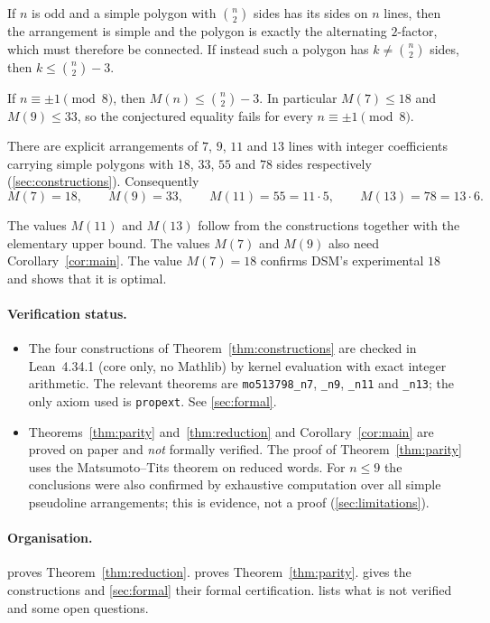 \begin{theorem}[Reduction]\label{thm:reduction}
If $n$ is odd and a simple polygon with $\binom n2$ sides has its sides on $n$ lines, then the
arrangement is simple and the polygon is exactly the alternating $2$-factor, which must therefore be
connected. If instead such a polygon has $k\neq\binom n2$ sides, then $k\le\binom n2-3$.
\end{theorem}

\begin{corollary}\label{cor:main}
If $n\equiv\pm1\pmod 8$, then $M(n)\le\binom n2-3$. In particular $M(7)\le 18$ and $M(9)\le 33$, so
the conjectured equality fails for every $n\equiv\pm 1\pmod 8$.
\end{corollary}

\begin{theorem}\label{thm:constructions}
There are explicit arrangements of $7$, $9$, $11$ and $13$ lines with integer coefficients carrying
simple polygons with $18$, $33$, $55$ and $78$ sides respectively (\cref{sec:constructions}).
Consequently
\[
  M(7)=18,\qquad M(9)=33,\qquad M(11)=55=11\cdot 5,\qquad M(13)=78=13\cdot 6 .
\]
\end{theorem}

The values $M(11)$ and $M(13)$ follow from the constructions together with the elementary upper bound.
The values $M(7)$ and $M(9)$ also need Corollary~\ref{cor:main}. The value $M(7)=18$ confirms DSM's
experimental $18$ and shows that it is optimal.

\paragraph{Verification status.}
\begin{itemize}
\item The four constructions of Theorem~\ref{thm:constructions} are checked in Lean~4.34.1 (core only, no
  Mathlib) by kernel evaluation with exact integer arithmetic. The relevant theorems are
  \texttt{mo513798\_n7}, \texttt{\_n9}, \texttt{\_n11} and \texttt{\_n13}; the only axiom used is
  \texttt{propext}. See \cref{sec:formal}.
\item Theorems~\ref{thm:parity} and~\ref{thm:reduction} and Corollary~\ref{cor:main} are proved on paper and \emph{not} formally
  verified. The proof of Theorem~\ref{thm:parity} uses the Matsumoto--Tits theorem on reduced words.
  For $n\le 9$ the conclusions were also confirmed by exhaustive computation over all simple
  pseudoline arrangements; this is evidence, not a proof (\cref{sec:limitations}).
\end{itemize}

\paragraph{Organisation.}  proves Theorem~\ref{thm:reduction}.  proves
Theorem~\ref{thm:parity}.  gives the constructions and \cref{sec:formal} their formal
certification.  lists what is not verified and some open questions.
